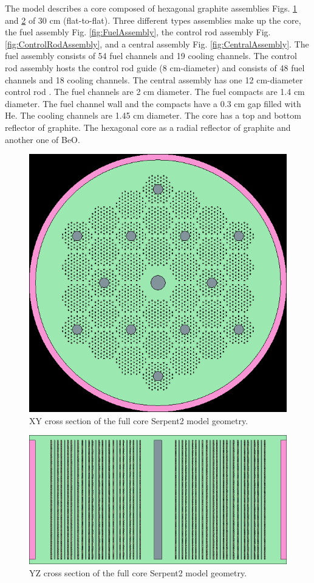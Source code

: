 The model describes a core composed of hexagonal graphite assemblies Figs. \ref{fig:FullXY} and \ref{fig:FullYZ} of 30 cm (flat-to-flat). Three different types assemblies make up the core, the fuel assembly Fig. \ref{fig:FuelAssembly}, the control rod assembly Fig. \ref{fig:ControlRodAssembly}, and a central assembly Fig. \ref{fig:CentralAssembly}. The fuel assembly consists of 54 fuel channels and 19 cooling channels. The control rod assembly hosts the control rod guide (8 cm-diameter) and consists of 48 fuel channels and 18 cooling channels. The central assembly has one 12 cm-diameter control rod \cite{hawari_development_2018}. The fuel channels are 2 cm diameter. The fuel compacts are 1.4 cm diameter. The fuel channel wall and the compacts have a 0.3 cm gap filled with He. The cooling channels are 1.45 cm diameter. The core has a top and bottom reflector of graphite. The hexagonal core as a radial reflector of graphite and another one of BeO.

\begin{figure}[H]
	\centering
	\includegraphics[width=0.45\linewidth]{figures/MMR_full_stack_geom1.png}
	\hfill
	\caption{XY cross section of the full core Serpent2 model geometry.}
	\label{fig:FullXY}
\end{figure}

\begin{figure}[H]
	\centering
	\includegraphics[width=0.6\linewidth]{figures/MMR_full_stack_geom2.png}
	\hfill
	\caption{YZ cross section of the full core Serpent2 model geometry.}
	\label{fig:FullYZ}
\end{figure}

